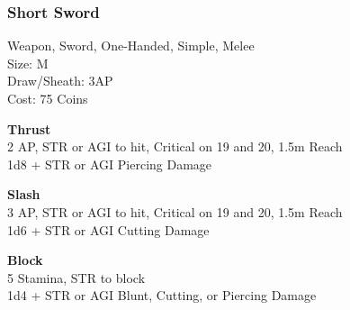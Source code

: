 \subsubsection{Short Sword}\label{weapon:shortSword}
Weapon, Sword, One-Handed, Simple, Melee\\
Size: M\\
Draw/Sheath: 3AP\\
Cost: 75 Coins

\textbf{Thrust}\\
2 AP, STR or AGI to hit, Critical on 19 and 20, 1.5m Reach\\
1d8 + \texttimes STR or AGI Piercing Damage

\textbf{Slash}\\
3 AP, STR or AGI to hit, Critical on 19 and 20, 1.5m Reach\\
1d6 + \texttimes STR or AGI Cutting Damage

\textbf{Block}\\
5 Stamina, STR to block\\
1d4 + \texttimes STR or AGI Blunt, Cutting, or Piercing Damage

